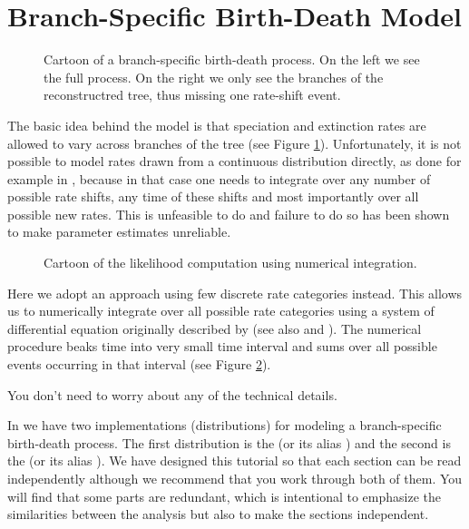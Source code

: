 

\bigskip
\section{Branch-Specific Birth-Death Model}

\begin{figure}[htbp!]
\centering
{}
\caption{\small Cartoon of a branch-specific birth-death process. On the left we see the full process. On the right we only see the branches of the reconstructred tree, thus missing one rate-shift event.}
\label{fig:BSBD}
\end{figure}
The basic idea behind the model is that speciation and extinction rates are allowed to vary across branches of the tree (see Figure \ref{fig:BSBD}).
Unfortunately, it is not possible to model rates drawn from a continuous distribution directly, as done for example in \BAMM, because in that case one needs to integrate over any number of possible rate shifts, any time of these shifts and most importantly over all possible new rates.
This is unfeasible to do and failure to do so has been shown to make parameter estimates unreliable.

\begin{figure}[htbp!]
\centering
{}
\caption{\small Cartoon of the likelihood computation using numerical integration.}
\label{fig:BSBD_likelihood}
\end{figure}
Here we adopt an approach using few discrete rate categories instead.
This allows us to numerically integrate over all possible rate categories using a system of differential equation originally described by \cite{Maddison2007} (see also \cite{FitzJohn2009} and \cite{FitzJohn2010}).
The numerical procedure beaks time into very small time interval and sums over all possible events occurring in that interval (see Figure \ref{fig:BSBD_likelihood}).

You don't need to worry about any of the technical details.

In \RevBayes we have two implementations (\IE distributions) for modeling a branch-specific birth-death process.
The first distribution is the  (or its alias ) and the second is the  (or its alias ).
We have designed this tutorial so that each section can be read independently although we recommend that you work through both of them.
You will find that some parts are redundant, which is intentional to emphasize the similarities between the analysis but also to make the sections independent.


